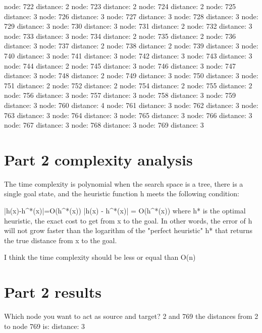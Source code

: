 \documentclass{article}
\begin{document}
node: 722 distance: 2
node: 723 distance: 2
node: 724 distance: 2
node: 725 distance: 3
node: 726 distance: 3
node: 727 distance: 3
node: 728 distance: 3
node: 729 distance: 3
node: 730 distance: 3
node: 731 distance: 2
node: 732 distance: 3
node: 733 distance: 3
node: 734 distance: 2
node: 735 distance: 2
node: 736 distance: 3
node: 737 distance: 2
node: 738 distance: 2
node: 739 distance: 3
node: 740 distance: 3
node: 741 distance: 3
node: 742 distance: 3
node: 743 distance: 3
node: 744 distance: 2
node: 745 distance: 3
node: 746 distance: 3
node: 747 distance: 3
node: 748 distance: 2
node: 749 distance: 3
node: 750 distance: 3
node: 751 distance: 2
node: 752 distance: 2
node: 754 distance: 2
node: 755 distance: 2
node: 756 distance: 3
node: 757 distance: 3
node: 758 distance: 3
node: 759 distance: 3
node: 760 distance: 4
node: 761 distance: 3
node: 762 distance: 3
node: 763 distance: 3
node: 764 distance: 3
node: 765 distance: 3
node: 766 distance: 3
node: 767 distance: 3
node: 768 distance: 3
node: 769 distance: 3



\section{Part 2 complexity analysis}
\label{sec:complexity2}
The time complexity is polynomial when the search space is a tree, there is a single goal state, and the heuristic function h meets the following condition:

{\displaystyle |h(x)-h^{*}(x)|=O(\log h^{*}(x))} |h(x) - h^*(x)| = O(\log h^*(x))
where h* is the optimal heuristic, the exact cost to get from x to the goal.
 In other words, the error of h will not grow faster than the logarithm of
 the "perfect heuristic" h* that returns the true distance from x to the goal.

 I think the time complexity should be less or equal than O(n)


\section{Part 2 results}
\label{sec:part2}

Which node you want to act as source and target?
2 and 769
the distances from 2 to node 769 is:
distance: 3
\end{document}
